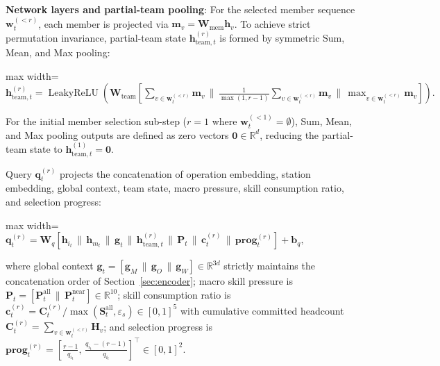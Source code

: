 \documentclass[journal,10pt]{IEEEtran}
\begin{document}
\textbf{Network layers and partial-team pooling}:
For the selected member sequence $\mathbf w_t^{(<r)}$, each member is projected via $\mathbf m_v = \mathbf W_{\mathrm{mem}}\mathbf h_v$. To achieve strict permutation invariance, partial-team state $\mathbf h_{\mathrm{team},t}^{(r)}$ is formed by symmetric Sum, Mean, and Max pooling:
\begin{center}
\begin{adjustbox}{max width=\columnwidth}
$\displaystyle
\mathbf h_{\mathrm{team},t}^{(r)} = \operatorname{LeakyReLU}\left(\mathbf W_{\mathrm{team}} \left[\sum_{v\in \mathbf w_t^{(<r)}} \mathbf m_v \,\|\, \frac{1}{\max(1, r-1)}\sum_{v\in \mathbf w_t^{(<r)}} \mathbf m_v \,\|\, \max_{v\in \mathbf w_t^{(<r)}} \mathbf m_v\right]\right).
$
\end{adjustbox}
\end{center}
For the initial member selection sub-step ($r=1$ where $\mathbf w_t^{(<1)}=\emptyset$), Sum, Mean, and Max pooling outputs are defined as zero vectors $\mathbf 0\in\mathbb R^d$, reducing the partial-team state to $\mathbf h_{\mathrm{team},t}^{(1)}=\mathbf 0$.

\newpage

Query $\mathbf q_t^{(r)}$ projects the concatenation of operation embedding, station embedding, global context, team state, macro pressure, skill consumption ratio, and selection progress:
\begin{center}
\begin{adjustbox}{max width=\columnwidth}
$\displaystyle
\mathbf q_t^{(r)}=\mathbf W_q\left[\mathbf h_{i_t}\,\|\,\mathbf h_{m_t}\,\|\,\mathbf g_t\,\|\,\mathbf h_{\mathrm{team},t}^{(r)}\,\|\,\mathbf P_t\,\|\,\mathbf c_t^{(r)}\,\|\,\mathbf{prog}_t^{(r)}\right]+\mathbf b_q,
$
\end{adjustbox}
\end{center}
where global context $\mathbf g_t = [\mathbf g_M \,\|\, \mathbf g_O \,\|\, \mathbf g_W] \in \mathbb R^{3d}$ strictly maintains the concatenation order of Section~\ref{sec:encoder}; macro skill pressure is $\mathbf P_t = [\mathbf P_t^{\mathrm{all}} \,\|\, \mathbf P_t^{\mathrm{near}}] \in \mathbb R^{10}$; skill consumption ratio is $\mathbf c_t^{(r)} = \mathbf C_t^{(r)} / \max(\mathbf S_t^{\mathrm{all}}, \varepsilon_s) \in [0,1]^5$ with cumulative committed headcount $\mathbf C_t^{(r)} = \sum_{v\in\mathbf w_t^{(<r)}} \mathbf H_v$; and selection progress is $\mathbf{prog}_t^{(r)} = \left[\frac{r-1}{q_{i_t}},\, \frac{q_{i_t}-(r-1)}{q_{i_t}}\right]^\top \in [0,1]^2$.
\end{document}
